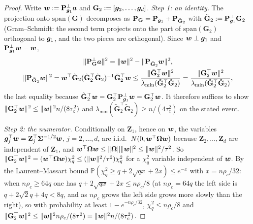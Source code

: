 \documentclass[11pt]{article}
\theoremstyle{definition}
\newcommand{\bZ}{\mathbf{Z}}
\newcommand{\bSig}{\boldsymbol{\Sigma}}
\newcommand{\bOm}{\boldsymbol{\Omega}}
\newcommand{\Prob}{\mathbb{P}}
\begin{document}
\begin{proof}
Write $\bm{w}:=\mathbf P^\perp_{\bm{g}_1}\bm a$ and $\mathbf G_2:=[\bm{g}_2,\dots,\bm{g}_d]$. \emph{Step 1: an identity.} The projection onto $\mathrm{span}(\mathbf G)$ decomposes as $\mathbf P_{\mathbf G}=\mathbf P_{\bm{g}_1}+\mathbf P_{\tilde{\mathbf G}_2}$ with $\tilde{\mathbf G}_2:=\mathbf P^\perp_{\bm{g}_1}\mathbf G_2$ (Gram--Schmidt: the second term projects onto the part of $\mathrm{span}(\mathbf G_2)$ orthogonal to $\bm{g}_1$, and the two pieces are orthogonal). Since $\bm{w}\perp\bm{g}_1$ and $\mathbf P^\perp_{\bm{g}_1}\bm{w}=\bm{w}$,
\begin{gather*}
\|\mathbf P^\perp_{\mathbf G}\bm a\|^2=\|\bm{w}\|^2-\|\mathbf P_{\tilde{\mathbf G}_2}\bm{w}\|^2,\\
\|\mathbf P_{\tilde{\mathbf G}_2}\bm{w}\|^2=\bm{w}^\top\tilde{\mathbf G}_2(\tilde{\mathbf G}_2^\top\tilde{\mathbf G}_2)^{-1}\tilde{\mathbf G}_2^\top\bm{w}\le\frac{\|\tilde{\mathbf G}_2^\top\bm{w}\|^2}{\lambda_{\min}(\tilde{\mathbf G}_2^\top\tilde{\mathbf G}_2)}=\frac{\|\mathbf G_2^\top\bm{w}\|^2}{\lambda_{\min}(\tilde{\mathbf G}_2^\top\tilde{\mathbf G}_2)},
\end{gather*}
the last equality because $\tilde{\mathbf G}_2^\top\bm{w}=\mathbf G_2^\top\mathbf P^\perp_{\bm{g}_1}\bm{w}=\mathbf G_2^\top\bm{w}$. It therefore suffices to show $\|\mathbf G_2^\top\bm{w}\|^2\le\|\bm{w}\|^2n/(8\tau_c^2)$ and $\lambda_{\min}(\tilde{\mathbf G}_2^\top\tilde{\mathbf G}_2)\ge n/(4\tau_c^2)$ on the stated event.

\emph{Step 2: the numerator.} Conditionally on $\bZ_1$, hence on $\bm{w}$, the variables $\bg_j^\top\bw=\bZ_j^\top\bSig^{-1/2}\bw$, $j=2,\dots,d$, are i.i.d.\ $N(0,\bw^\top\bOm\bw)$ because $\bZ_2,\dots,\bZ_d$ are independent of $\bZ_1$, and $\bw^\top\bOm\bw\le\|\bOm\|\|\bw\|^2\le\|\bw\|^2/\tau^2$. So $\|\mathbf G_2^\top\bw\|^2=(\bw^\top\bOm\bw)\chi^2_q\le(\|\bw\|^2/\tau^2)\chi^2_q$ for a $\chi^2_q$ variable independent of $\bm{w}$. By the Laurent--Massart bound $\Prob(\chi^2_q\ge q+2\sqrt{qx}+2x)\le e^{-x}$ with $x=n\rho_c/32$: when $n\rho_c\ge64q$ one has $q+2\sqrt{qx}+2x\le n\rho_c/8$ (at $n\rho_c=64q$ the left side is $q+2\sqrt2q+4q<8q$, and as $n\rho_c$ grows the left side grows more slowly than the right), so with probability at least $1-e^{-n\rho_c/32}$, $\chi^2_q\le n\rho_c/8$ and $\|\mathbf G_2^\top\bm{w}\|^2\le\|\bm{w}\|^2n\rho_c/(8\tau^2)=\|\bm{w}\|^2n/(8\tau_c^2)$.


\end{proof}
\end{document}
